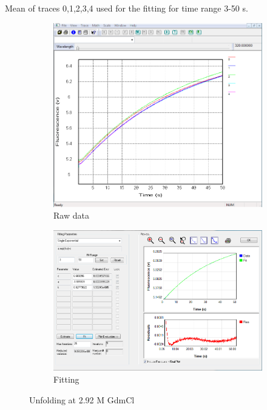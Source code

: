 \documentclass[a4paper,english,12pt,bibliography=totoc]{scrreprt}
\begin{document}
Mean of traces 0,1,2,3,4 used for the fitting for time range 3-50 s.
\begin{figure}[H]
    \centering
    \begin{subfigure}[b]{0.45\textwidth}
        \centering
        \includegraphics[width=\textwidth]{Images/G8/uf2_raw.PNG}
        \caption{Raw data }
        \label{fig:sub1}
    \end{subfigure}
    \hspace{0cm} %
    \begin{subfigure}[b]{0.45\textwidth}
        \centering
        \includegraphics[width=\textwidth]{Images/G8/uf2_fitting.PNG}
        \caption{Fitting}
        \label{fig:sub2}
    \end{subfigure}
    \caption{Unfolding at 2.92 M GdmCl }
    \label{fig:main}
\end{figure}
\end{document}

